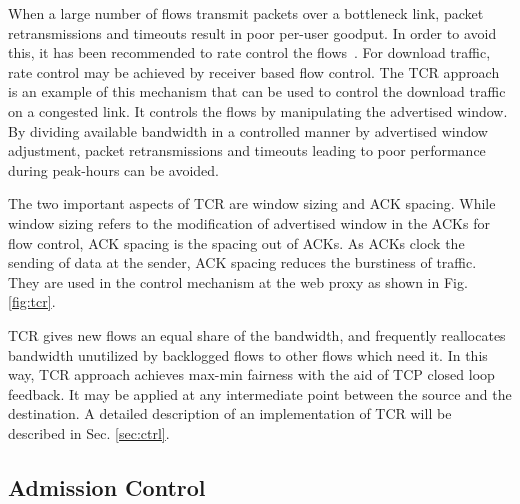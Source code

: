 \documentclass[conference]{../../IEEEtran}
\begin{document}
When a large number of flows transmit packets over a bottleneck link, packet retransmissions and timeouts result in poor per-user goodput. In order to avoid this, it has been recommended to rate control the flows~\cite{references:morris97}. For download traffic, rate control may be achieved by receiver based flow control. The TCR approach~\cite{references:karandikar} is an example of this mechanism that can be used to control the download traffic on a congested link. It controls the flows by manipulating the advertised window. By dividing available bandwidth in a controlled manner by advertised window adjustment, packet retransmissions and timeouts leading to poor performance during peak-hours can be avoided.



The two important aspects of TCR are window sizing and ACK spacing. While window sizing refers to the modification of advertised window in the ACKs for flow control, ACK spacing is the spacing out of ACKs. As ACKs clock the sending of data at the sender, ACK spacing reduces the burstiness of traffic. They are used in the control mechanism at the web proxy as shown in Fig. \ref{fig:tcr}.

TCR gives new flows an equal share of the bandwidth, and frequently reallocates bandwidth unutilized by backlogged flows to other flows which need it. In this way,  TCR approach achieves max-min fairness with the aid of TCP closed loop feedback. It may be applied at any intermediate point between the source and the destination. A detailed description of an implementation of TCR will be described in Sec. \ref{sec:ctrl}.

\subsection{Admission Control}
\label{sec:admctrl}
\end{document}
